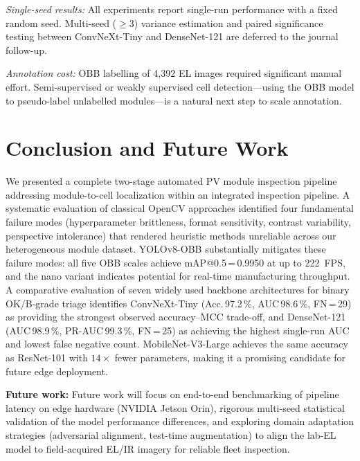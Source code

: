 \documentclass[conference]{IEEEtran}
\begin{document}
\textit{Single-seed results:} All experiments report single-run performance with a fixed random seed. Multi-seed ($\geq$3) variance estimation and paired significance testing between ConvNeXt-Tiny and DenseNet-121 are deferred to the journal follow-up.

\textit{Annotation cost:} OBB labelling of 4{,}392 EL images required significant manual effort. Semi-supervised or weakly supervised cell detection---using the OBB model to pseudo-label unlabelled modules---is a natural next step to scale annotation.

\section{Conclusion and Future Work}
\label{sec:conclusion}

We presented a complete two-stage automated PV module inspection pipeline addressing module-to-cell localization within an integrated inspection pipeline. A systematic evaluation of classical OpenCV approaches identified four fundamental failure modes (hyperparameter brittleness, format sensitivity, contrast variability, perspective intolerance) that rendered heuristic methods unreliable across our heterogeneous module dataset. YOLOv8-OBB substantially mitigates these failure modes: all five OBB scales achieve mAP@0.5\,=\,0.9950 at up to 222~FPS, and the nano variant indicates potential for real-time manufacturing throughput. A comparative evaluation of seven widely used backbone architectures for binary OK/B-grade triage identifies ConvNeXt-Tiny (Acc.\,97.2\,\%, AUC\,98.6\,\%, FN\,=\,29) as providing the strongest observed accuracy--MCC trade-off, and DenseNet-121 (AUC\,98.9\,\%, PR-AUC\,99.3\,\%, FN\,=\,25) as achieving the highest single-run AUC and lowest false negative count. MobileNet-V3-Large achieves the same accuracy as ResNet-101 with $14\times$ fewer parameters, making it a promising candidate for future edge deployment.

\textbf{Future work:} Future work will focus on end-to-end benchmarking of pipeline latency on edge hardware (NVIDIA Jetson Orin), rigorous multi-seed statistical validation of the model performance differences, and exploring domain adaptation strategies (adversarial alignment, test-time augmentation) to align the lab-EL model to field-acquired EL/IR imagery for reliable fleet inspection.



\end{document}

